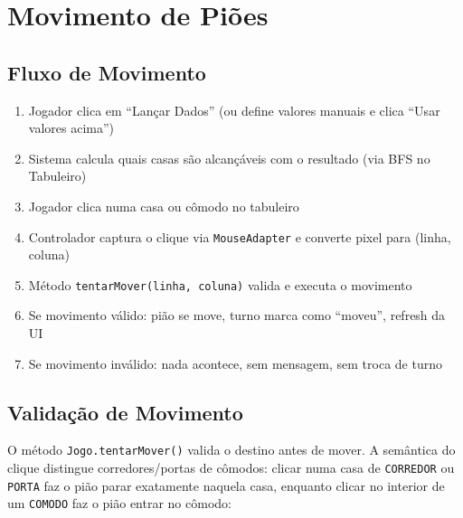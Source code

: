 \documentclass[12pt,a4paper]{report}
\begin{document}
\section{Movimento de Piões}

\subsection{Fluxo de Movimento}

\begin{enumerate}
    \item Jogador clica em ``Lançar Dados'' (ou define valores manuais e clica ``Usar valores acima'')
    \item Sistema calcula quais casas são alcançáveis com o resultado (via BFS no Tabuleiro)
    \item Jogador clica numa casa ou cômodo no tabuleiro
    \item Controlador captura o clique via \texttt{MouseAdapter} e converte pixel para (linha, coluna)
    \item Método \texttt{tentarMover(linha, coluna)} valida e executa o movimento
    \item Se movimento válido: pião se move, turno marca como ``moveu'', refresh da UI
    \item Se movimento inválido: nada acontece, sem mensagem, sem troca de turno
\end{enumerate}

\subsection{Validação de Movimento}
\label{sec:movimento-validacao}

O método \texttt{Jogo.tentarMover()} valida o destino antes de mover. A semântica do clique distingue corredores/portas de cômodos: clicar numa casa de \texttt{CORREDOR} ou \texttt{PORTA} faz o pião parar exatamente naquela casa, enquanto clicar no interior de um \texttt{COMODO} faz o pião entrar no cômodo:
\end{document}
